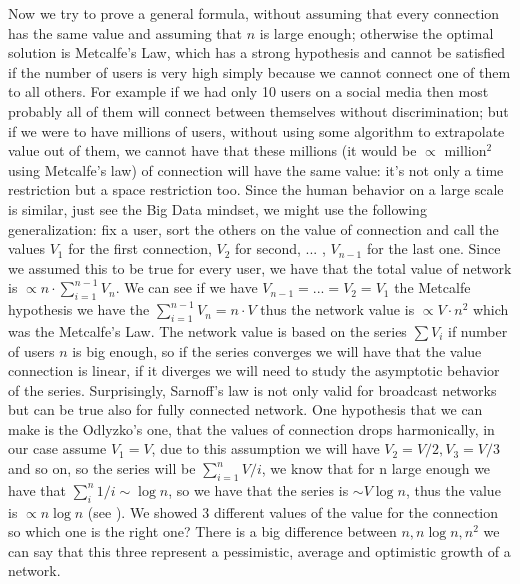 \documentclass[12pt, a4page]{article}
\begin{document}
Now we try to prove a general formula, without assuming that every connection has the same value and assuming that $n$ is large enough; otherwise the optimal solution is Metcalfe's Law, which has a strong hypothesis and cannot be satisfied if the number of users is very high simply because we cannot connect one of them to all others.
For example if we had only 10 users on a social media then most probably all of them will connect between themselves without discrimination; but if we were to have millions of users, without using some algorithm to extrapolate value out of them, we cannot have that these millions (it would be $\propto$ million$^2$ using Metcalfe's law) of connection will have the same value: it's not only a time restriction but a space restriction too. Since the human behavior on a large scale is similar, just see the Big Data mindset, we might use the following generalization:
fix a user, sort the others on the value of connection and call the values $V_1$ for the first connection, $V_2$ for second, ... , $V_{n-1}$ for the last one.
\newline
Since we assumed this to be true for every user, we have that the total value of network is $\propto n \cdot \sum_{i=1}^{n-1} V_n$. We can see if we have $V_{n-1}=...=V_2=V_1$ the Metcalfe hypothesis we have the $ \sum_{i=1}^{n-1} V_n = n\cdot V$ thus the network value is $\propto V \cdot n^2$ which was the Metcalfe's Law.
The network value is based on the series $\sum V_i$ if number of users $n$ is big enough, so if the series converges we will have that the value connection is linear, if it diverges we will need to study the asymptotic behavior of the series.
Surprisingly, Sarnoff's law is not only valid for broadcast networks but can be true also for fully connected network.\newline
One hypothesis that we can make is the Odlyzko's one, that the values of connection drops harmonically, in our case assume $V_1 = V$, due to this assumption we will have $V_2 = V/2, V_3 = V/3$ and so on, so the series will be $\sum_{i=1}^n V/i$, we know that for n large enough we have that $\sum_i^n 1/i \sim \log n$, so we have that the series is $\sim V \log n$, thus the value is $\propto n \log n$ (see \cite{Odlyzko_Law}).\newline
We showed 3 different values of the value for the connection so which one is the right one? There is a big difference between $n, n\log n, n^2$ we can say that this three represent a pessimistic, average and optimistic growth of a network.
\end{document}
